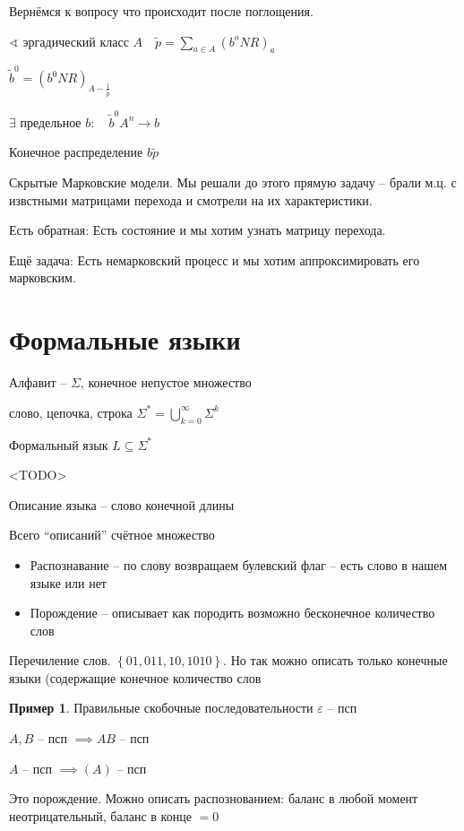 \documentclass{book}
\newcommand{\tl}[1]{\widetilde{#1}}
\theoremstyle{definition}
\newtheorem*{example}{Пример}
\begin{document}
Вернёмся к вопросу что происходит после поглощения.

$\sphericalangle $ эргадический класс $A\quad \tl p = \sum_{a\in A}\left( b^oNR \right)_a $

$\tl b^0 = \left( b^0NR \right) _{A - \frac{1}{\tl p}}$ 

$\exists $ предельное $b:\quad \tl b^0 A^n \to b$

Конечное распределение $b\tl p$


Скрытые Марковские модели. Мы решали до этого прямую задачу -- брали м.ц. с извстными матрицами перехода и смотрели на их характеристики.

Есть обратная: Есть состояние и мы хотим узнать матрицу перехода.

Ещё задача: Есть немарковский процесс и мы хотим аппроксимировать его марковским.


\section{Формальные языки}


Алфавит -- $\Sigma$, конечное непустое множество

слово, цепочка, строка  $\Sigma^* = \bigcup\limits_{k=0}^{\infty }\Sigma^k$

Формальный язык $L\subseteq \Sigma^*$

<TODO>

\begin{definition}
    Описание языка -- слово конечной длины

    Всего ``описаний'' счётное множество 
\end{definition}

\begin{itemize}
    \item Распознавание -- по слову возвращаем булевский флаг -- есть слово в нашем языке или нет
    \item Порождение -- описывает как породить возможно бесконечное количество слов
\end{itemize}

\begin{definition}
    Перечиление слов.  $\left\{ 01,011,10,1010 \right\} $. Но так можно описать только конечные языки (содержащие конечное количество слов
\end{definition}

\begin{example}
    Правильные скобочные последовательности
    $\varepsilon$ -- псп

    $A,B$ -- псп  $\implies AB$ -- псп

    $A$ -- псп  $\implies (A)$ -- псп

    Это порождение. Можно описать распознованием: баланс в любой момент неотрицательный, баланс в конце $=0$
\end{example}
\end{document}
